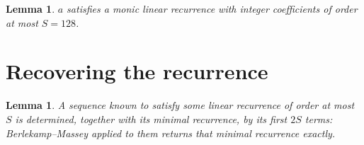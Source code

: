 \documentclass[11pt,a4paper]{article}
\theoremstyle{plain}
\newtheorem{lemma}[theorem]{Lemma}
\theoremstyle{definition}
\begin{document}
\begin{lemma}\label{lem:cf}
$a$ satisfies a monic linear recurrence with integer coefficients of order at most $S=128$.
\end{lemma}

\section{Recovering the recurrence}

\begin{lemma}\label{lem:bm}
A sequence known to satisfy some linear recurrence of order at most $S$ is determined, together
with its minimal recurrence, by its first $2S$ terms: Berlekamp--Massey applied to them returns
that minimal recurrence exactly.
\end{lemma}
\end{document}
